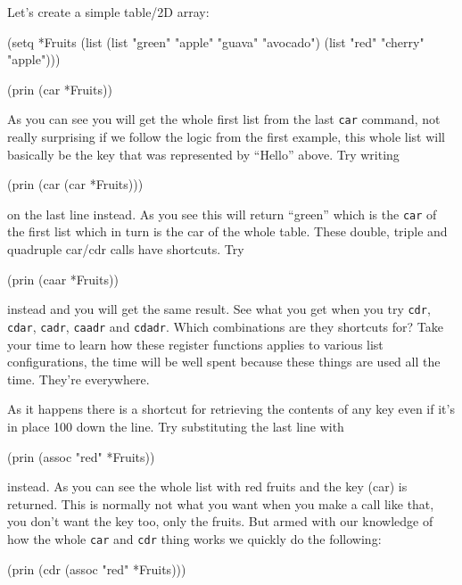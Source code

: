 Let's create a simple table/2D array:

\begin{wideverbatim}
(setq *Fruits 
      (list 
       (list "green" "apple" "guava" "avocado") 
       (list "red" "cherry" "apple")))

(prin (car *Fruits))
\end{wideverbatim}

As you can see you will get the whole first list from the last \texttt{car}
command, not really surprising if we follow the logic from the first
example, this whole list will basically be the key that was represented
by ``Hello'' above. Try writing


\begin{wideverbatim}
(prin (car (car *Fruits)))
\end{wideverbatim}

on the last line instead. As you see this will return ``green'' which is
the \texttt{car} of the first list which in turn is the car of the whole table.
These double, triple and quadruple car/cdr calls have shortcuts. Try


\begin{wideverbatim}
(prin (caar *Fruits))
\end{wideverbatim}

instead and you will get the same result. See what you get when you
try \texttt{cdr}, \texttt{cdar}, \texttt{cadr}, \texttt{caadr} and
\texttt{cdadr}. Which combinations are they shortcuts for? Take your
time to learn how these register functions applies to various list
configurations, the time will be well spent because these things are
used all the time. They're everywhere.

As it happens there is a shortcut for retrieving the contents of any key
even if it's in place 100 down the line. Try substituting the last line
with

\begin{wideverbatim}
(prin (assoc "red" *Fruits))
\end{wideverbatim}

instead. As you can see the whole list with red fruits and the key
(car) is returned. This is normally not what you want when you make a
call like that, you don't want the key too, only the fruits. But armed
with our knowledge of how the whole \texttt{car} and \texttt{cdr}
thing works we quickly do the following:


\begin{wideverbatim}
(prin (cdr (assoc "red" *Fruits)))
\end{wideverbatim}


